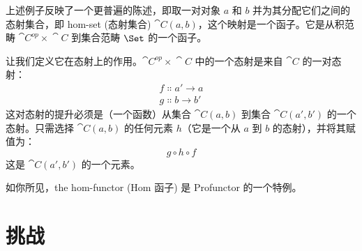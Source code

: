 上述例子反映了一个更普遍的陈述，即取一对对象 $a$ 和 $b$ 并为其分配它们之间的态射集合，即 hom-set (态射集合) $\cat{C}(a, b)$，这个映射是一个函子。它是从积范畴 $\cat{C}^\mathit{op}\times{}\cat{C}$ 到集合范畴 $\Set$ 的一个函子。

让我们定义它在态射上的作用。$\cat{C}^\mathit{op}\times{}\cat{C}$ 中的一个态射是来自 $\cat{C}$ 的一对态射：
\begin{gather*}
  f \Colon a' \to a \\
  g \Colon b \to b'
\end{gather*}
这对态射的提升必须是（一个函数）从集合 $\cat{C}(a, b)$ 到集合 $\cat{C}(a', b')$ 的一个态射。只需选择 $\cat{C}(a, b)$ 的任何元素 $h$（它是一个从 $a$ 到 $b$ 的态射），并将其赋值为：
\[g \circ h \circ f\]
这是 $\cat{C}(a', b')$ 的一个元素。

如你所见，the hom-functor (Hom 函子) 是 Profunctor 的一个特例。

\section{挑战}

